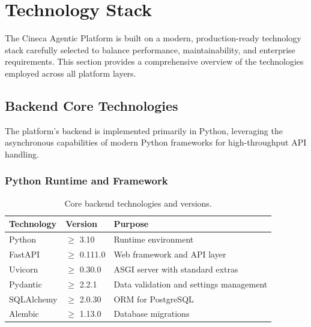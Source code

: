
\section{Technology Stack}
\label{sec:tech-stack}

The Cineca Agentic Platform is built on a modern, production-ready technology stack carefully selected to balance performance, maintainability, and enterprise requirements. This section provides a comprehensive overview of the technologies employed across all platform layers.

\subsection{Backend Core Technologies}

The platform's backend is implemented primarily in Python, leveraging the asynchronous capabilities of modern Python frameworks for high-throughput API handling.

\subsubsection{Python Runtime and Framework}

\begin{table}[ht]
\centering
\caption{Core backend technologies and versions.}
\label{tab:backend-stack}
\small
\begin{tabular}{lll}
\hline
\textbf{Technology} & \textbf{Version} & \textbf{Purpose} \\
\hline
Python & $\geq$ 3.10 & Runtime environment \\
FastAPI & $\geq$ 0.111.0 & Web framework and API layer \\
Uvicorn & $\geq$ 0.30.0 & ASGI server with standard extras \\
Pydantic & $\geq$ 2.2.1 & Data validation and settings management \\
SQLAlchemy & $\geq$ 2.0.30 & ORM for PostgreSQL \\
Alembic & $\geq$ 1.13.0 & Database migrations \\
\hline
\end{tabular}
\end{table}

